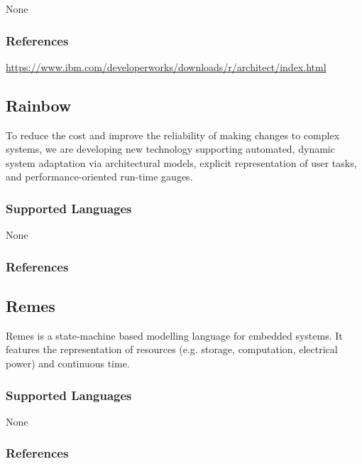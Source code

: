 None


\subsubsection{References}

\url{https://www.ibm.com/developerworks/downloads/r/architect/index.html}



\subsection{Rainbow}
\label{subsecT:Rainbow}

To reduce the cost and improve the reliability of making changes to complex systems, we are developing new technology supporting automated, dynamic system adaptation via architectural models, explicit representation of user tasks, and performance-oriented run-time gauges.

\subsubsection{Supported Languages}

None


\subsubsection{References}





\subsection{Remes}
\label{subsecT:Remes}


Remes is a state-machine based modelling language for embedded systems.
It features the representation of resources (e.g. storage, computation, electrical power) and continuous time.

\subsubsection{Supported Languages}

None


\subsubsection{References}

